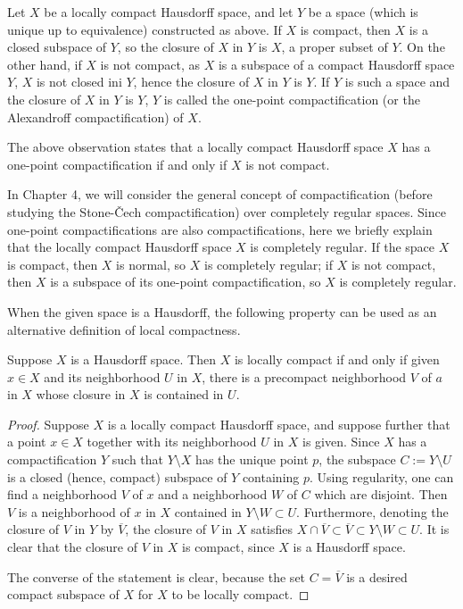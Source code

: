 Let $X$ be a locally compact Hausdorff space, and let $Y$ be a space (which is unique up to equivalence) constructed as above.
If $X$ is compact, then $X$ is a closed subspace of $Y$, so the closure of $X$ in $Y$ is $X$, a proper subset of $Y$.
On the other hand, if $X$ is not compact, as $X$ is a subspace of a compact Hausdorff space $Y$, $X$ is not closed ini $Y$, hence the closure of $X$ in $Y$ is $Y$.
If $Y$ is such a space and the closure of $X$ in $Y$ is $Y$, $Y$ is called the one-point compactification (or the Alexandroff compactification) of $X$.
\begin{rmk}
    The above observation states that a locally compact Hausdorff space $X$ has a one-point compactification if and only if $X$ is not compact.
\end{rmk}
\begin{rmk}
    In Chapter 4, we will consider the general concept of compactification (before studying the Stone-\v{C}ech compactification) over completely regular spaces.
    Since one-point compactifications are also compactifications, here we briefly explain that the locally compact Hausdorff space $X$ is completely regular.
    If the space $X$ is compact, then $X$ is normal, so $X$ is completely regular; if $X$ is not compact, then $X$ is a subspace of its one-point compactification, so $X$ is completely regular.
\end{rmk}

When the given space is a Hausdorff, the following property can be used as an alternative definition of local compactness.
\begin{prop}
    Suppose $X$ is a Hausdorff space.
    Then $X$ is locally compact if and only if given $x\in X$ and its neighborhood $U$ in $X$, there is a precompact neighborhood $V$ of $a$ in $X$ whose closure in $X$ is contained in $U$.
\end{prop}
\begin{proof}
    Suppose $X$ is a locally compact Hausdorff space, and suppose further that a point $x\in X$ together with its neighborhood $U$ in $X$ is given.
    Since $X$ has a compactification $Y$ such that $Y\setminus X$ has the unique point $p$, the subspace $C:=Y\setminus U$ is a closed (hence, compact) subspace of $Y$ containing $p$.
    Using regularity, one can find a neighborhood $V$ of $x$ and a neighborhood $W$ of $C$ which are disjoint.
    Then $V$ is a neighborhood of $x$ in $X$ contained in $Y\setminus W\subset U$.
    Furthermore, denoting the closure of $V$ in $Y$ by $\overline{V}$, the closure of $V$ in $X$ satisfies $X\cap\overline{V}\subset\overline{V}\subset Y\setminus W\subset U$.
    It is clear that the closure of $V$ in $X$ is compact, since $X$ is a Hausdorff space.

    The converse of the statement is clear, because the set $C=\overline{V}$ is a desired compact subspace of $X$ for $X$ to be locally compact.
\end{proof}

